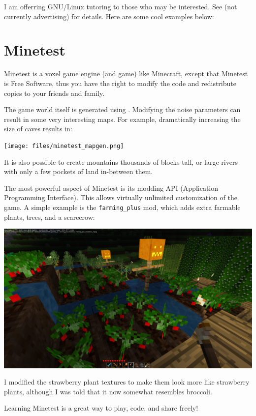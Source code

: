 \documentclass{article}
\begin{document}
I am offerring GNU/Linux tutoring to those who may be interested.  See  (not currently advertising) for details.  Here are some cool examples below:

\section{Minetest}
Minetest is a voxel game engine (and game) like Minecraft, except that Minetest is Free Software, thus you have the right to modify the code and redistribute copies to your friends and family.

The game world itself is generated using .  Modifying the noise parameters can result in some very interesting maps.  For example, dramatically increasing the size of caves results in:
\begin{center}
\texttt{[image: files/minetest\_mapgen.png]}
\end{center}
It is also possible to create mountains thousands of blocks tall, or large rivers with only a few pockets of land in-between them.

The most powerful aspect of Minetest is its modding API (Application Programming Interface).  This allows virtually unlimited customization of the game.  A simple example is the \texttt{farming\_plus} mod, which adds extra farmable plants, trees, and a scarecrow:
\begin{center}
\includegraphics[scale=0.25]{files/minetest_farming.png}
\end{center}
I modified the strawberry plant textures to make them look more like strawberry plants, although I was told that it now somewhat resembles broccoli.

Learning Minetest is a great way to play, code, and share freely!
\end{document}
